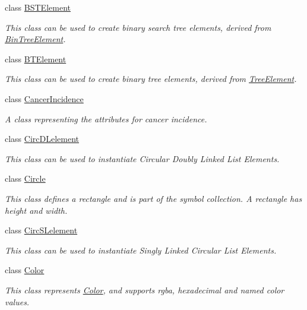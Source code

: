 \begin{DoxyCompactItemize}
class \hyperlink{classbridges_1_1_b_s_t_element}{B\+S\+T\+Element}
\begin{DoxyCompactList}\small\item\em This class can be used to create binary search tree elements, derived from \hyperlink{classbridges_1_1_bin_tree_element}{Bin\+Tree\+Element}. \end{DoxyCompactList}\item 
class \hyperlink{classbridges_1_1_b_t_element}{B\+T\+Element}
\begin{DoxyCompactList}\small\item\em This class can be used to create binary tree elements, derived from \hyperlink{classbridges_1_1_tree_element}{Tree\+Element}. \end{DoxyCompactList}\item 
class \hyperlink{classbridges_1_1_cancer_incidence}{Cancer\+Incidence}
\begin{DoxyCompactList}\small\item\em A class representing the attributes for cancer incidence. \end{DoxyCompactList}\item 
class \hyperlink{classbridges_1_1_circ_d_lelement}{Circ\+D\+Lelement}
\begin{DoxyCompactList}\small\item\em This class can be used to instantiate Circular Doubly Linked List Elements. \end{DoxyCompactList}\item 
class \hyperlink{classbridges_1_1_circle}{Circle}
\begin{DoxyCompactList}\small\item\em This class defines a rectangle and is part of the symbol collection. A rectangle has height and width. \end{DoxyCompactList}\item 
class \hyperlink{classbridges_1_1_circ_s_lelement}{Circ\+S\+Lelement}
\begin{DoxyCompactList}\small\item\em This class can be used to instantiate Singly Linked Circular List Elements. \end{DoxyCompactList}\item 
class \hyperlink{classbridges_1_1_color}{Color}
\begin{DoxyCompactList}\small\item\em This class represents \hyperlink{classbridges_1_1_color}{Color}, and supports rgba, hexadecimal and named color values. \end{DoxyCompactList}\item 

\end{DoxyCompactItemize}
